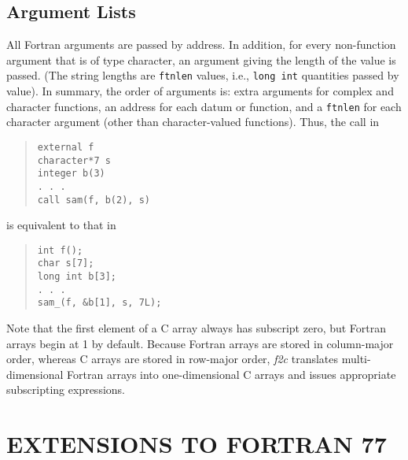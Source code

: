 \documentclass[12pt]{article}
\begin{document}
\subsection*{Argument Lists}

All Fortran arguments are passed by address. In addition, for every non-function argument that is of type character, an argument giving the length of the value is passed. (The string lengths are \verb|ftnlen| values, i.e., \verb|long int| quantities passed by value). In summary, the order of arguments is: extra arguments for complex and character functions, an address for each datum or function, and a \verb|ftnlen| for each character argument (other than character-valued functions). Thus, the call in
\begin{quote}
\begin{verbatim}
external f
character*7 s
integer b(3)
. . .
call sam(f, b(2), s)
\end{verbatim}
\end{quote}
is equivalent to that in
\begin{quote}
\begin{verbatim}
int f();
char s[7];
long int b[3];
. . .
sam_(f, &b[1], s, 7L);
\end{verbatim}
\end{quote}
Note that the first element of a C array always has subscript zero, but Fortran arrays begin at 1 by default. Because Fortran arrays are stored in column-major order, whereas C arrays are stored in row-major order, \emph{f2c} translates multi-dimensional Fortran arrays into one-dimensional C arrays and issues appropriate subscripting expressions.

\section{EXTENSIONS TO FORTRAN 77}
\end{document}
